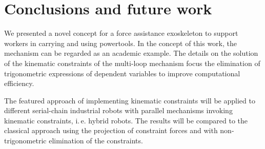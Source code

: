 \documentclass[letterpaper, 10 pt, conference]{ieeeconf}  %
\begin{document}
\section{Conclusions and future work}
\label{sec:conclusion}

We presented a novel concept for a force assistance exoskeleton to support workers in carrying and using powertools.
In the concept of this work, the mechanism can be regarded as an academic example.
The details on the solution of the kinematic constraints of the multi-loop mechanism focus the elimination of trigonometric expressions of dependent variables to improve computational efficiency.

The featured approach of implementing kinematic constraints will be applied to different serial-chain industrial robots with parallel mechanisms invoking kinematic constraints, i.\,e. hybrid robots. 
The results will be compared to the classical approach using the projection of constraint forces and with non-trigonometric elimination of the constraints.








%








\end{document}
